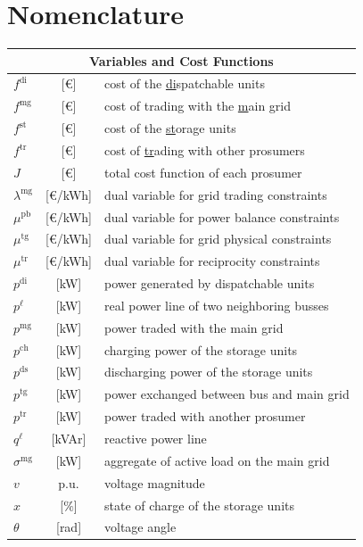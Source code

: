 \documentclass{IEEEtran}  %
\newcommand{\0}{\mathbf{0}}
\newcommand{\1}{\mathbf{1}}
\begin{document}
\section*{Nomenclature}
\begin{table}[h]
	\small 
	\begin{tabular}{l c l}
		\toprule
		\multicolumn{3}{c}{Variables and Cost Functions} \\
		\hline
		$f^{\mathrm{di}}$ & [\euro] & cost of the \underline{di}spatchable units  \\
		$f^{\mathrm{mg}}$ & [\euro] & cost of trading with the \underline{m}ain \underline{g}rid  \\
		$f^{\mathrm{st}}$ & [\euro] & cost  of the \underline{st}orage units  \\
		$f^{\mathrm{tr}}$ & [\euro]& cost  of \underline{tr}ading with other prosumers  \\
		$J$ &[\euro]  & total cost function of each prosumer \\
		$\lambda^{\mathrm{mg}}$ &[\euro/kWh] & dual variable for grid trading constraints %
		\\
		$\mu^{\mathrm{pb}}$ & [\euro/kWh]& dual variable for power balance constraints \\
		$\mu^{\mathrm{tg}}$ &[\euro/kWh] & dual variable for grid physical constraints
		\\
		$\mu^{\mathrm{tr}}$ &[\euro/kWh] & dual variable for reciprocity constraints \\
		$p^{\mathrm{di}}$ & [kW]& power generated by {di}spatchable units  \\
		$p^{\ell}$ &[kW] & real power line of two neighboring busses  \\
		$p^{\mathrm{mg}}$ &[kW] & power traded with the {m}ain {g}rid  \\
		{$p^{\mathrm{ch}}$} &[kW] & {charging power of the {st}orage units}  \\
		{$p^{\mathrm{ds}}$} &[kW] & {discharging power of the {st}orage units}  \\
		$p^{\mathrm{tg}}$ &[kW] & power exchanged between bus and main grid \\	
		$p^{\mathrm{tr}}$ & [kW]& power {tr}aded with another prosumer  \\
		$q^{\ell}$ &[kVAr] & reactive power line   \\
		$\sigma^{\mathrm{mg}}$ &[kW] & aggregate of active load on the main grid \\
		$v$ &p.u. & voltage magnitude \\
		$x$ & [$\%$] & state of charge of the storage units\\
		$\theta$ & [rad]& voltage angle \\
		\hline 

	\end{tabular}
\end{table} 
\end{document}

